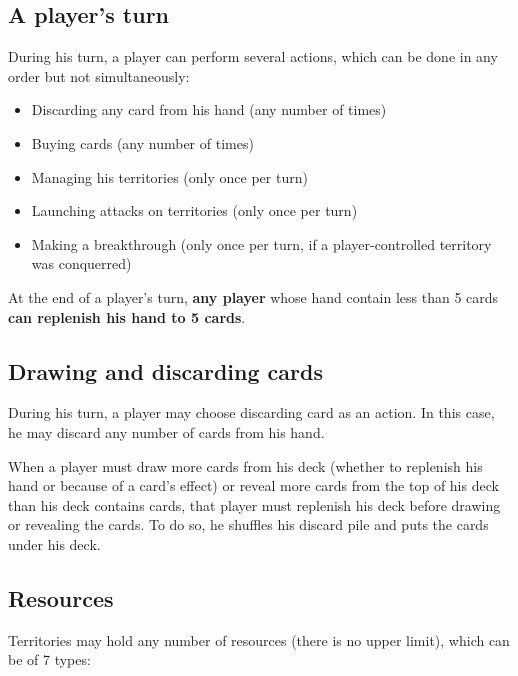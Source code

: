 \documentclass[a4paper]{article}
\begin{document}
  \subsection{A player's turn}

    \hspace{-2em} During his turn, a player can perform several actions,
    which can be done in any order but not simultaneously:
    \vspace{-1.3em}
    \begin{itemize}
        \item Discarding any card from his hand (any number of times)
        \item Buying cards (any number of times)
        \item Managing his territories (only once per turn)
        \item Launching attacks on territories (only once per turn)
        \item Making a breakthrough (only once per turn,
        if a player-controlled territory was conquerred)
    \end{itemize}
    
    \vspace{-0.7em}
    At the end of a player's turn, \textbf{any player} whose hand contain less than 5
    cards \textbf{can replenish his hand to 5 cards}.


  \subsection{Drawing and discarding cards}
    
    During his turn, a player may choose discarding card as an action.
    In this case, he may discard any number of cards from his hand.

    When a player must draw more cards from his deck
    (whether to replenish his hand or because of a card's effect)
    or reveal more cards from the top of his deck than his deck contains cards,
    that player must replenish his deck before drawing or revealing the cards.
    To do so, he shuffles his discard pile and puts the cards under his deck.


\newpage
  \subsection{Resources}
  
    Territories may hold any number of resources (there is no upper limit),
    which can be of 7 types:
    
\end{document}
